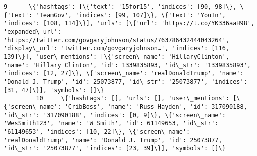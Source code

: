 \documentclass[11pt]{article}
\begin{document}
\begin{Verbatim}[commandchars=\\\{\}]
         9      \{'hashtags': [\{'text': '15for15', 'indices': [90, 98]\}, \{'text': 'TeamGov', 'indices': [99, 107]\}, \{'text': 'YouIn', 'indices': [108, 114]\}], 'urls': [\{'url': 'https://t.co/YK336aaH98', 'expanded\_url': 'https://twitter.com/govgaryjohnson/status/763786432444043264', 'display\_url': 'twitter.com/govgaryjohnson…', 'indices': [116, 139]\}], 'user\_mentions': [\{'screen\_name': 'HillaryClinton', 'name': 'Hillary Clinton', 'id': 1339835893, 'id\_str': '1339835893', 'indices': [12, 27]\}, \{'screen\_name': 'realDonaldTrump', 'name': 'Donald J. Trump', 'id': 25073877, 'id\_str': '25073877', 'indices': [31, 47]\}], 'symbols': []\}                                                                                                                                                                                                                                                                                                                                                                                                                                                                                                                                                                      
         10     \{'hashtags': [], 'urls': [], 'user\_mentions': [\{'screen\_name': 'CribBoss', 'name': 'Russ Hayden', 'id': 317090188, 'id\_str': '317090188', 'indices': [0, 9]\}, \{'screen\_name': 'WesSmith123', 'name': 'W Smith', 'id': 61149653, 'id\_str': '61149653', 'indices': [10, 22]\}, \{'screen\_name': 'realDonaldTrump', 'name': 'Donald J. Trump', 'id': 25073877, 'id\_str': '25073877', 'indices': [23, 39]\}], 'symbols': []\}                                                                                                                                                                                                                                                                                                                                                                                                                                                                                                                                                                                                                                                                                                                                                                                          

\end{Verbatim}
\end{document}
